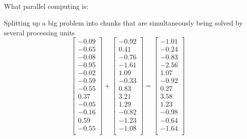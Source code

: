 \documentclass[xcolor=dvipsnames,aspectratio=169]{beamer}
\begin{document}
\subsection*{}
\begin{frame}{What parallel computing is:}
\pause

Splitting up a big problem into chunks that are simultaneously being solved by several processing units
\pause
\begin{equation*}
\begin{bmatrix}
  -0.09 \\ 
  -0.65 \\ 
  -0.08 \\ 
  -0.95 \\ 
  -0.02 \\ 
  -0.59 \\ 
  -0.55 \\ 
  0.37 \\ 
  -0.05 \\ 
  -0.16 \\ 
  0.59 \\ 
  -0.55 \\ 
  \end{bmatrix}
+
\begin{bmatrix}
  -0.92 \\ 
  0.41 \\ 
  -0.76 \\ 
  -1.61 \\ 
  1.09 \\ 
  -0.33 \\ 
  0.83 \\ 
  3.21 \\ 
  1.29 \\ 
  -0.82 \\ 
  -1.23 \\ 
  -1.08 \\ 
  \end{bmatrix}
=
\begin{bmatrix}
  -1.01 \\ 
  -0.24 \\ 
  -0.83 \\ 
  -2.56 \\ 
  1.07 \\ 
  -0.92 \\ 
  0.27 \\ 
  3.58 \\ 
  1.23 \\ 
  -0.98 \\ 
  -0.64 \\ 
  -1.64 \\ 
  \end{bmatrix} 
\end{equation*}
\end{frame}
\end{document}
